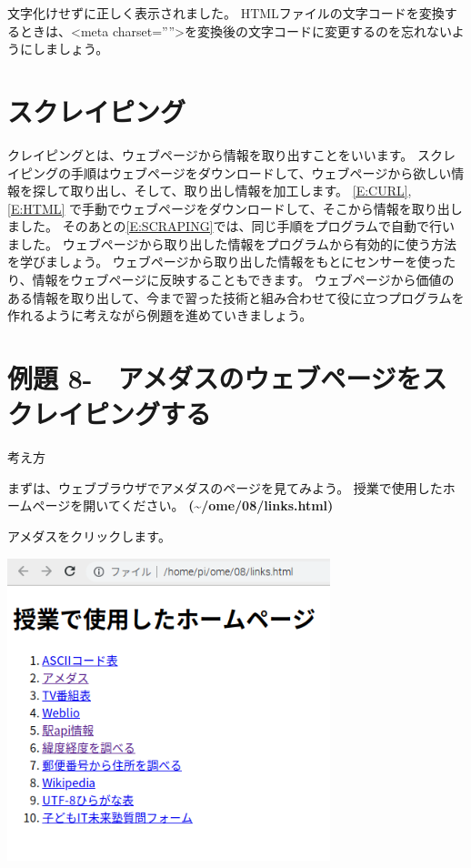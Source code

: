 \documentclass[a4paper,12pt,dvipdfmx]{jarticle}
\newcounter{Exercise}
\renewcommand\theExercise{例題 8-\arabic{Exercise}}
\begin{document}
\bigskip


\bigskip

文字化けせずに正しく表示されました。
HTMLファイルの文字コードを変換するときは、{\textless}meta
charset=””{\textgreater}を変換後の文字コードに変更するのを忘れないようにしましょう。

\clearpage\section{スクレイピング}
クレイピングとは、ウェブページから情報を取り出すことをいいます。
スクレイピングの手順はウェブページをダウンロードして、ウェブページから欲しい情報を探して取り出し、そして、取り出し情報を加工します。
\ref*{E:CURL},\ref*{E:HTML}
で手動でウェブページをダウンロードして、そこから情報を取り出しました。
そのあとの\ref*{E:SCRAPING}では、同じ手順をプログラムで自動で行いました。
ウェブページから取り出した情報をプログラムから有効的に使う方法を学びましょう。
ウェブページから取り出した情報をもとにセンサーを使ったり、情報をウェブページに反映することもできます。
ウェブページから価値のある情報を取り出して、今まで習った技術と組み合わせて役に立つプログラムを作れるように考えながら例題を進めていきましょう。



\bigskip
{}
\clearpage\section{\theExercise　アメダスのウェブページをスクレイピングする}
考え方

まずは、ウェブブラウザでアメダスのページを見てみよう。
授業で使用したホームページを開いてください。
\textbf{(\~{}/ome/08/links.html)}

アメダスをクリックします。 



\begin{center}
\includegraphics[width=9.398cm,height=8.784cm]{textbook-img017.png}

\end{center}
\end{document}
